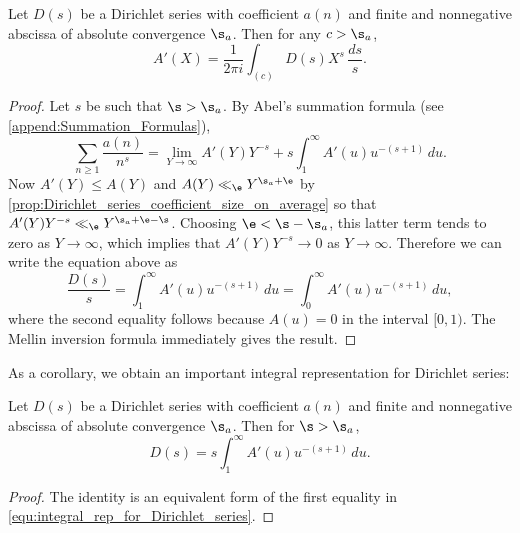     \begin{theorem}
      Let $D(s)$ be a Dirichlet series with coefficient $a(n)$ and finite and nonnegative abscissa of absolute convergence $\s_{a}$. Then for any $c > \s_{a}$,
      \[
        A'(X) = \frac{1}{2\pi i}\int_{(c)}D(s)X^{s}\,\frac{ds}{s}.
      \]
    \end{theorem}
    \begin{proof}
      Let $s$ be such that $\s > \s_{a}$. By Abel's summation formula (see \cref{append:Summation_Formulas}),
      \[
        \sum_{n \ge 1}\frac{a(n)}{n^{s}} = \lim_{Y \to \infty}A'(Y)Y^{-s}+s\int_{1}^{\infty}A'(u)u^{-(s+1)}\,du.
      \]
      Now $A'(Y) \le A(Y)$ and $A(Y) \ll_{\e} Y^{\s_{a}+\e}$ by \cref{prop:Dirichlet_series_coefficient_size_on_average} so that $A'(Y)Y^{-s} \ll_{\e} Y^{\s_{a}+\e-\s}$. Choosing $\e < \s-\s_{a}$, this latter term tends to zero as $Y \to \infty$, which implies that $A'(Y)Y^{-s} \to 0$ as $Y \to \infty$. Therefore we can write the equation above as
      \begin{equation}\label{equ:integral_rep_for_Dirichlet_series}
         \frac{D(s)}{s} = \int_{1}^{\infty}A'(u)u^{-(s+1)}\,du = \int_{0}^{\infty}A'(u)u^{-(s+1)}\,du,
      \end{equation}
      where the second equality follows because $A(u) = 0$ in the interval $[0,1)$. The Mellin inversion formula immediately gives the result.
    \end{proof}

    As a corollary, we obtain an important integral representation for Dirichlet series:

    \begin{corollary}\label{cor:integral_rep_for_Dirichlet_series}
      Let $D(s)$ be a Dirichlet series with coefficient $a(n)$ and finite and nonnegative abscissa of absolute convergence $\s_{a}$. Then for $\s > \s_{a}$,
      \[
        D(s) = s\int_{1}^{\infty}A'(u)u^{-(s+1)}\,du.
      \]
    \end{corollary}
    \begin{proof}
      The identity is an equivalent form of the first equality in \cref{equ:integral_rep_for_Dirichlet_series}.
    \end{proof}

